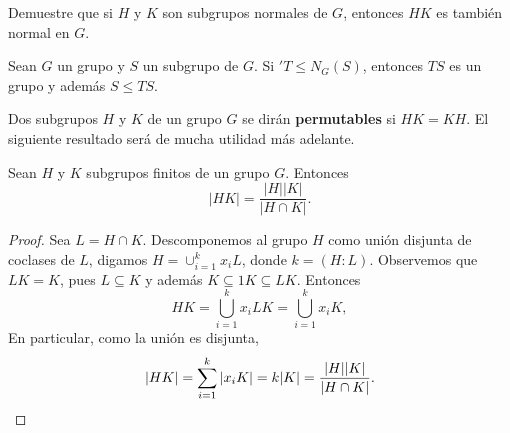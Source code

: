 \begin{exercise}
Demuestre que si $H$ y $K$ son subgrupos normales de $G$, entonces $HK$ es también normal en $G$.
\end{exercise}

\begin{exercise}
Sean $G$ un grupo y $S$ un subgrupo de $G$. 
Si $'T\leq N_G(S)$, entonces $TS$ es un grupo y además $S\leq TS$. 
\end{exercise}

Dos subgrupos $H$ y $K$ de un grupo $G$ se dirán \textbf{permutables} si $HK=KH$. 
El siguiente resultado será de mucha utilidad más adelante.

\begin{theorem}
\label{thm:|HK|}
	Sean $H$ y $K$ subgrupos finitos de un grupo $G$. Entonces
	\[
		|HK|=\frac{|H||K|}{|H\cap K|}.
	\]
\end{theorem}
	
\begin{proof}
Sea $L=H\cap K$. 
Descomponemos al grupo $H$ como unión disjunta de coclases de $L$, digamos 
$H=\cup_{i=1}^k x_iL$, donde $k=(H:L)$. Observemos que $LK=K$, pues $L\subseteq K$ y además $K\subseteq 1K\subseteq LK$. 
Entonces
\[
HK=\bigcup_{i=1}^k x_iLK=\bigcup_{i=1}^k x_iK,
\]
En particular, como la unión es disjunta, 
\[
|HK|=\sum_{i=1}^k |x_iK|=k|K|=\frac{|H||K|}{|H\cap K|}.\qedhere
\] 
\end{proof}

%	

